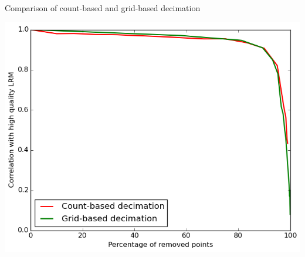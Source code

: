 \documentclass[xcolor={dvipsnames,usenames},beamer,aspectratio=169]{beamer}
\begin{document}
\begin{frame}{Comparison of count-based and grid-based decimation}

\begin{center}
\includegraphics[height=0.8\textheight]{lrm_comparison_grid_count}
\end{center}

\end{frame}
\end{document}

